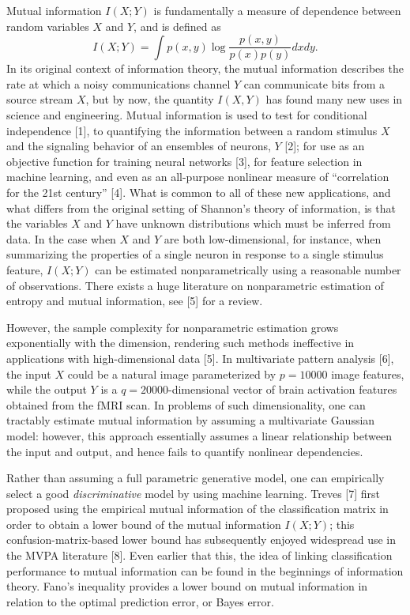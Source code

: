 \documentclass{article}
\begin{document}
Mutual information $I(X; Y)$ is fundamentally a measure of dependence
between random variables $X$ and $Y$, and is defined as
\[
I(X;Y) = \int p(x, y) \log \frac{p(x, y)}{p(x)p(y)}dxdy.
\]
In its original context of information theory, the mutual information
describes the rate at which a noisy communications channel $Y$ can
communicate bits from a source stream $X$, but by now, the quantity
$I(X, Y)$ has found many new uses in science and engineering.  Mutual
information is used to test for conditional independence [1], to
quantifying the information between a random stimulus $X$ and the
signaling behavior of an ensembles of neurons, $Y$ [2]; for
use as an objective function for training neural networks [3], for
feature selection in machine learning, and even as an all-purpose
nonlinear measure of ``correlation for the 21st century'' [4].
What is common to all of these new applications, and what differs from
the original setting of Shannon's theory of information, is that the
variables $X$ and $Y$ have unknown distributions which must be
inferred from data.  In the case when $X$ and $Y$ are both
low-dimensional, for instance, when summarizing the properties of a
single neuron in response to a single stimulus feature, $I(X; Y)$ can
be estimated nonparametrically using a reasonable number of
observations.  There exists a huge literature on nonparametric
estimation of entropy and mutual information, see [5] for a
review.

However, the sample complexity for nonparametric estimation grows
exponentially with the dimension, rendering such methods ineffective
in applications with high-dimensional data [5].  In multivariate pattern analysis [6],
 the input $X$ could be a natural image parameterized by $p = 10000$ image features,
while the output $Y$ is a $q=20000$-dimensional vector of brain
activation features obtained from the fMRI scan.  In problems of such
dimensionality, one can tractably estimate mutual information by
assuming a multivariate Gaussian model: however, this approach
essentially assumes a linear relationship between the input and
output, and hence fails to quantify nonlinear dependencies.  

Rather than assuming a full parametric generative model, one can empirically
select a good \emph{discriminative} model by using machine learning.
Treves [7] first proposed using the empirical mutual information of
the classification matrix in order to obtain a lower bound of the
mutual information $I(X; Y)$; this confusion-matrix-based lower bound
has subsequently enjoyed widespread use in the MVPA literature
[8].  Even earlier that this, the idea of linking
classification performance to mutual information can be found in the
beginnings of information theory.
Fano's inequality provides a lower bound on mutual information in relation to
the optimal prediction error, or Bayes error.  
\end{document}
